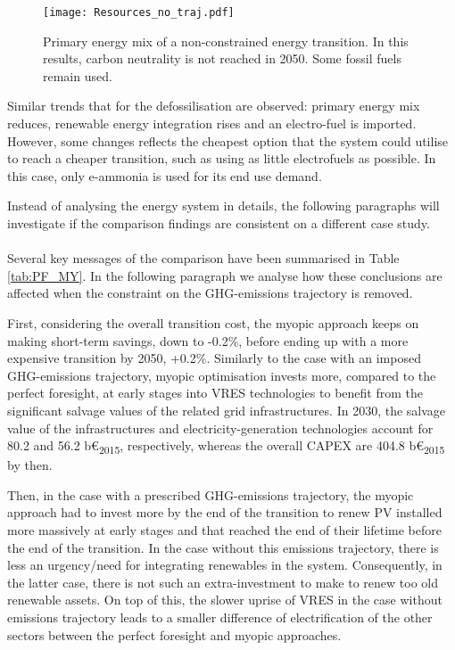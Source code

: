 \begin{figure}[!htbp]
\centering
\texttt{[image: Resources\_no\_traj.pdf]}
\caption{Primary energy mix of a non-constrained energy transition. In this results, carbon neutrality is not reached in 2050. Some fossil fuels remain used.}
\label{fig:EnergyMixPathwayWithoutGHGLimit}
\end{figure}

Similar trends that for the defossilisation are observed: primary energy mix reduces, renewable energy integration rises and an electro-fuel is imported. However, some changes reflects the cheapest option that the system could utilise to reach a cheaper transition, such as using as little electrofuels as possible. In this case, only e-ammonia is used for its end use demand.

Instead of analysing the energy system in details, the following paragraphs will investigate if the comparison findings are consistent on a different case study.\\

\\

\noindent
Several key messages of the comparison have been summarised in Table \ref{tab:PF_MY}. In the following paragraph we analyse how these conclusions are affected when the constraint on the \gls{GHG}-emissions trajectory is removed. 

First, considering the overall transition cost, the myopic approach keeps on making short-term savings, \ie down to -0.2\%, before ending up with a more expensive transition by 2050, \ie +0.2\%. Similarly to the case with an imposed \gls{GHG}-emissions trajectory, myopic optimisation invests more, compared to the perfect foresight, at early stages into \gls{VRES} technologies to benefit from the significant salvage values of the related grid infrastructures. In 2030, the salvage value of the infrastructures and electricity-generation technologies account for 80.2 and 56.2 b€\textsubscript{2015}, respectively, whereas the overall CAPEX are 404.8 b€\textsubscript{2015} by then.

Then, in the case with a prescribed \gls{GHG}-emissions trajectory, the myopic approach had to invest more by the end of the transition to renew \gls{PV} installed more massively at early stages and that reached the end of their lifetime before the end of the transition. In the case without this emissions trajectory, there is less an urgency/need for integrating renewables in the system. Consequently, in the latter case, there is not such an extra-investment to make to renew too old renewable assets. On top of this, the slower uprise of \gls{VRES} in the case without emissions trajectory leads to a smaller difference of electrification of the other sectors between the perfect foresight and myopic approaches.


